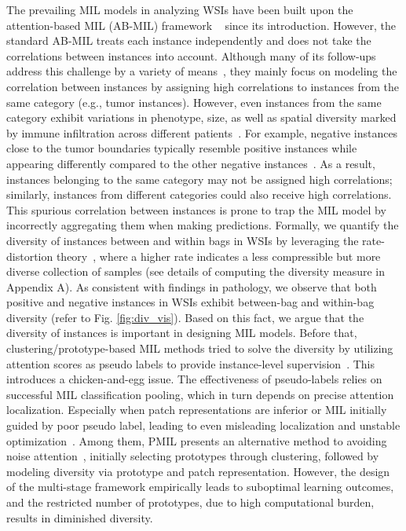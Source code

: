 \documentclass[runningheads]{llncs}
\begin{document}
\indent The prevailing MIL models in analyzing WSIs have been built upon the attention-based MIL (AB-MIL) framework ~\cite{ilse2018attention} since its introduction. However, the standard AB-MIL treats each instance independently and does not take the correlations between instances into account. Although many of its follow-ups address this challenge by a variety of means~\cite{li2021dual,shao2021transmil,zhang2022dtfd,lowrankmil}, they mainly focus on modeling the correlation between instances by assigning high correlations to instances from the same category (e.g., tumor instances). However, even instances from the same category exhibit variations in phenotype, size, as well as spatial diversity marked by immune infiltration across different patients~\cite{clinicdiversity,clinicdiversity2,clinicdiversity3}. For example, negative instances close to the tumor boundaries typically resemble positive instances while appearing differently compared to the other negative instances~\cite{similaritysupport}. As a result, instances belonging to the same category may not be assigned high correlations; similarly, instances from different categories could also receive high correlations. This spurious correlation between instances is prone to trap the MIL model by incorrectly aggregating them when making predictions. Formally, we quantify the diversity of instances between and within bags in WSIs by leveraging the rate-distortion theory~\cite{cover1999elements,yu2020learning,chen2023rd}, where a higher rate indicates a less compressible but more diverse collection of samples (see details of computing the diversity measure in Appendix A). As consistent with findings in pathology, we observe that both positive and negative instances in WSIs exhibit between-bag and within-bag diversity (refer to Fig.  \ref{fig:div_vis}). Based on this fact, we argue that the diversity of instances is important in designing MIL models. Before that, clustering/prototype-based MIL methods tried to solve the diversity by utilizing attention scores as pseudo labels to provide instance-level supervision~\cite{tpmil,scmil}. This introduces a chicken-and-egg issue. The effectiveness of pseudo-labels relies on successful MIL classification pooling, which in turn depends on precise attention localization. Especially when patch representations are inferior or MIL initially guided by poor pseudo label, leading to even misleading localization and unstable optimization~\cite{iterself,PDL}. Among them, PMIL presents an alternative method to avoiding noise attention~\cite{pmil}, initially selecting prototypes through clustering, followed by modeling diversity via prototype and patch representation. However, the design of the multi-stage framework empirically leads to suboptimal learning outcomes, and the restricted number of prototypes, due to high computational burden, results in diminished diversity. \\
\end{document}
